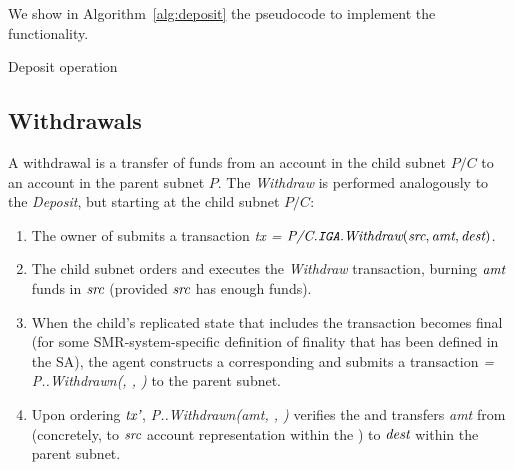 We show in Algorithm~\ref{alg:deposit} the pseudocode to implement the functionality. 

 

\begin{algorithm}[H]
\footnotesize
\caption{Deposit operation}\label{alg:deposit}
  \DontPrintSemicolon

\end{algorithm}

\subsection{Withdrawals}
\label{sec:withdraw}

A withdrawal is a transfer of funds from an account \src in the child subnet $P/C$ to an account \dest in the parent subnet $P$.
The \emph{Withdraw} is performed analogously to the \emph{Deposit}, but starting at the child subnet $P/C$:
\begin{enumerate}
  \item The owner of \src submits a transaction \emph{tx =} $\textit{P/C.\texttt{IGA}.Withdraw}(\textit{src}, \textit{amt}, \textit{dest})$.
    \item The child subnet orders and executes the \emph{Withdraw} transaction, burning $\textit{amt}$ funds in $\textit{src}$ (provided $\textit{src}$ has enough funds).
    \item When the child's replicated state that includes the transaction becomes final (for some SMR-system-specific definition of finality that has been defined in the SA), the \ipc agent constructs a corresponding \pof and submits a transaction \textit{ = P.\sa.Withdrawn(\fil, \dest, \pof)} to the parent subnet.
    \item Upon ordering $\textit{tx'}$, \emph{P.\sa.Withdrawn(amt, \dest, \pof)} verifies the \pof and transfers \emph{amt} from \sa (concretely, to $\textit{src}$ account representation within the \sa) to $\textit{dest}$ within the parent subnet.
\end{enumerate}

